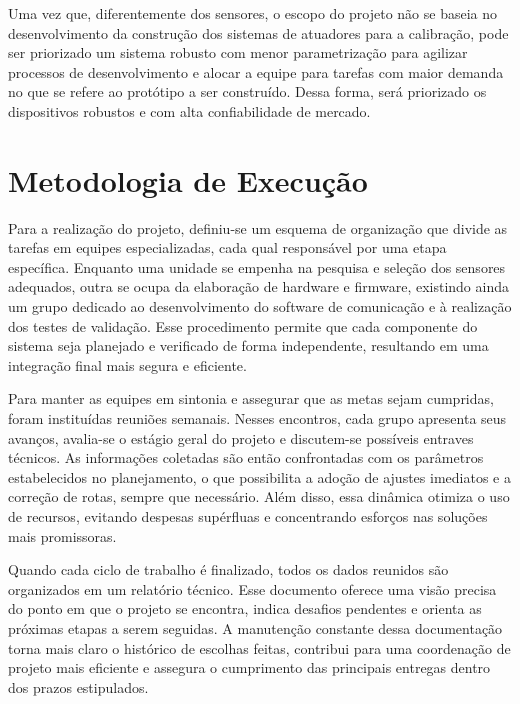 \documentclass[a4paper, 12pt]{article}
\begin{document}
        Uma vez que, diferentemente dos sensores, o escopo do projeto não se baseia no desenvolvimento da construção dos sistemas de atuadores para a calibração, pode ser priorizado um sistema robusto com menor parametrização para agilizar processos de desenvolvimento e alocar a equipe para tarefas com maior demanda no que se refere ao protótipo a ser construído. Dessa forma, será priorizado os dispositivos robustos e com alta confiabilidade de mercado.
        
    \newpage

\newpage
\section{Metodologia de Execução}
    Para a realização do projeto, definiu-se um esquema de organização que divide as tarefas em equipes especializadas, cada qual responsável por uma etapa específica. Enquanto uma unidade se empenha na pesquisa e seleção dos sensores adequados, outra se ocupa da elaboração de hardware e firmware, existindo ainda um grupo dedicado ao desenvolvimento do software de comunicação e à realização dos testes de validação. Esse procedimento permite que cada componente do sistema seja planejado e verificado de forma independente, resultando em uma integração final mais segura e eficiente.

    Para manter as equipes em sintonia e assegurar que as metas sejam cumpridas, foram instituídas reuniões semanais. Nesses encontros, cada grupo apresenta seus avanços, avalia-se o estágio geral do projeto e discutem-se possíveis entraves técnicos. As informações coletadas são então confrontadas com os parâmetros estabelecidos no planejamento, o que possibilita a adoção de ajustes imediatos e a correção de rotas, sempre que necessário. Além disso, essa dinâmica otimiza o uso de recursos, evitando despesas supérfluas e concentrando esforços nas soluções mais promissoras.
    
    Quando cada ciclo de trabalho é finalizado, todos os dados reunidos são organizados em um relatório técnico. Esse documento oferece uma visão precisa do ponto em que o projeto se encontra, indica desafios pendentes e orienta as próximas etapas a serem seguidas. A manutenção constante dessa documentação torna mais claro o histórico de escolhas feitas, contribui para uma coordenação de projeto mais eficiente e assegura o cumprimento das principais entregas dentro dos prazos estipulados.

\newpage
\end{document}
